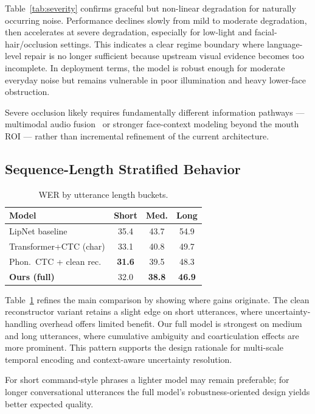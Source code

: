 \documentclass[10pt,twocolumn,letterpaper]{article}
\begin{document}
Table~\ref{tab:severity} confirms graceful but non-linear degradation for naturally occurring noise. Performance declines slowly from mild to moderate degradation, then accelerates at severe degradation, especially for low-light and facial-hair/occlusion settings. This indicates a clear regime boundary where language-level repair is no longer sufficient because upstream visual evidence becomes too incomplete. In deployment terms, the model is robust enough for moderate everyday noise but remains vulnerable in poor illumination and heavy lower-face obstruction.

Severe occlusion likely requires fundamentally different information pathways — multimodal audio fusion~\cite{shi2022robust} or stronger face-context modeling beyond the mouth ROI — rather than incremental refinement of the current architecture.

\subsection{Sequence-Length Stratified Behavior}
\begin{table}[t]
\centering
\small
\caption{WER by utterance length buckets.}
\label{tab:length-buckets}
\begin{tabular}{lccc}
\toprule
Model & Short & Med. & Long \\
\midrule
LipNet baseline        & 35.4          & 43.7          & 54.9 \\
Transformer+CTC (char) & 33.1          & 40.8          & 49.7 \\
Phon.\ CTC + clean rec.\ & \textbf{31.6} & 39.5          & 48.3 \\
\textbf{Ours (full)}   & 32.0          & \textbf{38.8} & \textbf{46.9} \\
\bottomrule
\end{tabular}
\end{table}

Table~\ref{tab:length-buckets} refines the main comparison by showing where gains originate. The clean reconstructor variant retains a slight edge on short utterances, where uncertainty-handling overhead offers limited benefit. Our full model is strongest on medium and long utterances, where cumulative ambiguity and coarticulation effects are more prominent. This pattern supports the design rationale for multi-scale temporal encoding and context-aware uncertainty resolution.

For short command-style phrases a lighter model may remain preferable; for longer conversational utterances the full model's robustness-oriented design yields better expected quality.
\end{document}

